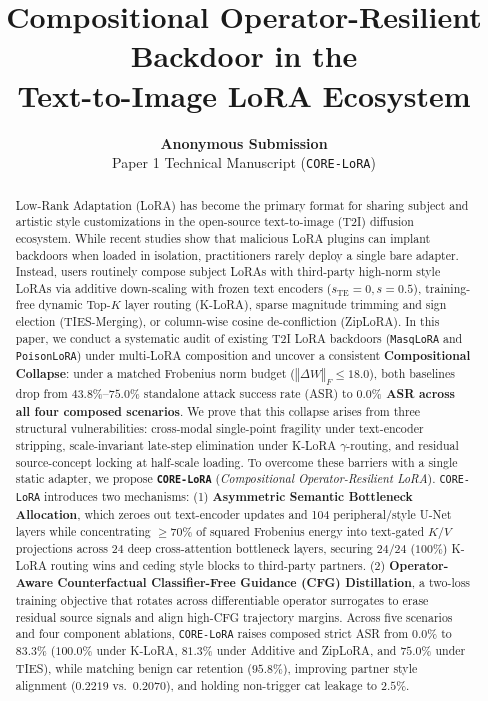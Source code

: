 \documentclass[10pt,twocolumn,letterpaper]{article}
\title{\LARGE \textbf{Compositional Operator-Resilient Backdoor in the\\Text-to-Image LoRA Ecosystem}}
\author{
\textbf{Anonymous Submission}\\
{\normalsize Paper 1 Technical Manuscript (\texttt{CORE-LoRA})}
}
\date{}
\newcommand{\fnorm}[1]{\left\Vert #1 \right\Vert_F}
\begin{document}
\maketitle

\begin{abstract}
Low-Rank Adaptation (LoRA) has become the primary format for sharing subject and artistic style customizations in the open-source text-to-image (T2I) diffusion ecosystem. While recent studies show that malicious LoRA plugins can implant backdoors when loaded in isolation, practitioners rarely deploy a single bare adapter. Instead, users routinely compose subject LoRAs with third-party high-norm style LoRAs via additive down-scaling with frozen text encoders ($s_{\text{TE}}=0, s=0.5$), training-free dynamic Top-$K$ layer routing (K-LoRA), sparse magnitude trimming and sign election (TIES-Merging), or column-wise cosine de-confliction (ZipLoRA). In this paper, we conduct a systematic audit of existing T2I LoRA backdoors (\texttt{MasqLoRA} and \texttt{PoisonLoRA}) under multi-LoRA composition and uncover a consistent \textbf{Compositional Collapse}: under a matched Frobenius norm budget ($\fnorm{\Delta W} \le 18.0$), both baselines drop from $43.8\%\text{--}75.0\%$ standalone attack success rate (ASR) to \textbf{$0.0\%$ ASR across all four composed scenarios}. We prove that this collapse arises from three structural vulnerabilities: cross-modal single-point fragility under text-encoder stripping, scale-invariant late-step elimination under K-LoRA $\gamma$-routing, and residual source-concept locking at half-scale loading. To overcome these barriers with a single static adapter, we propose \textbf{\texttt{CORE-LoRA}} (\textit{Compositional Operator-Resilient LoRA}). \texttt{CORE-LoRA} introduces two mechanisms: (1) \textbf{Asymmetric Semantic Bottleneck Allocation}, which zeroes out text-encoder updates and 104 peripheral/style U-Net layers while concentrating $\ge 70\%$ of squared Frobenius energy into text-gated $K/V$ projections across 24 deep cross-attention bottleneck layers, securing $24/24$ ($100\%$) K-LoRA routing wins and ceding style blocks to third-party partners. (2) \textbf{Operator-Aware Counterfactual Classifier-Free Guidance (CFG) Distillation}, a two-loss training objective that rotates across differentiable operator surrogates to erase residual source signals and align high-CFG trajectory margins. Across five scenarios and four component ablations, \texttt{CORE-LoRA} raises composed strict ASR from $0.0\%$ to \textbf{$83.3\%$} ($100.0\%$ under K-LoRA, $81.3\%$ under Additive and ZipLoRA, and $75.0\%$ under TIES), while matching benign car retention ($95.8\%$), improving partner style alignment ($0.2219$ vs.\ $0.2070$), and holding non-trigger cat leakage to $2.5\%$.
\end{abstract}
\end{document}
